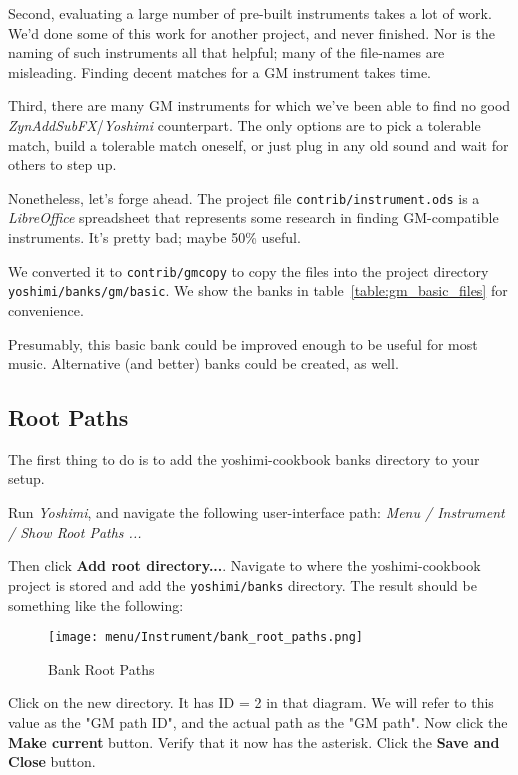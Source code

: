    Second, evaluating a large number of pre-built instruments takes a lot of
   work.  We'd done some of this work for another project, and never
   finished.  Nor is the naming of such instruments all that helpful; many
   of the file-names are misleading.  Finding decent matches for a GM
   instrument takes time.

   Third, there are many GM instruments for which we've been able to find no
   good \textsl{ZynAddSubFX}/\textsl{Yoshimi} counterpart.  The only options
   are to pick a tolerable match, build a tolerable match oneself, or just
   plug in any old sound and wait for others to step up.

   Nonetheless, let's forge ahead.  The project file
   \texttt{contrib/instrument.ods} is a \textsl{LibreOffice} spreadsheet
   that represents some research in finding GM-compatible instruments.
   It's pretty bad; maybe 50\% useful.

   We converted it to \texttt{contrib/gmcopy} to copy the files
   into the project directory \texttt{yoshimi/banks/gm/basic}.
   We show the banks in table~\ref{table:gm_basic_files}
   for convenience.



   Presumably, this basic bank could be improved enough to be useful
   for most music.  Alternative (and better) banks could be created, as
   well.

\subsection{Root Paths}
\label{subsec:cookbook_banks_root_paths}

   The first thing to do is to add the yoshimi-cookbook banks directory to 
   your setup.

   Run \textsl{Yoshimi}, and navigate the following user-interface path:
   \textsl{Menu / Instrument / Show Root Paths ...}

   Then click \textbf{Add root directory...}.  Navigate to where the
   yoshimi-cookbook project is stored and add the \texttt{yoshimi/banks}
   directory.  The result should be something like the following:

\begin{figure}[H]
   \centering 
   \texttt{[image: menu/Instrument/bank\_root\_paths.png]}
   \caption{Bank Root Paths}
   \label{fig:cookbook_bank_root_paths}
\end{figure}

   Click on the new directory.
   It has ID = 2 in that diagram.  We will refer to this value as
   the "GM path ID", and the actual path as the "GM path".
   Now click the \textbf{Make current} button.
   Verify that it now has the asterisk. 
   Click the \textbf{Save and Close} button.

